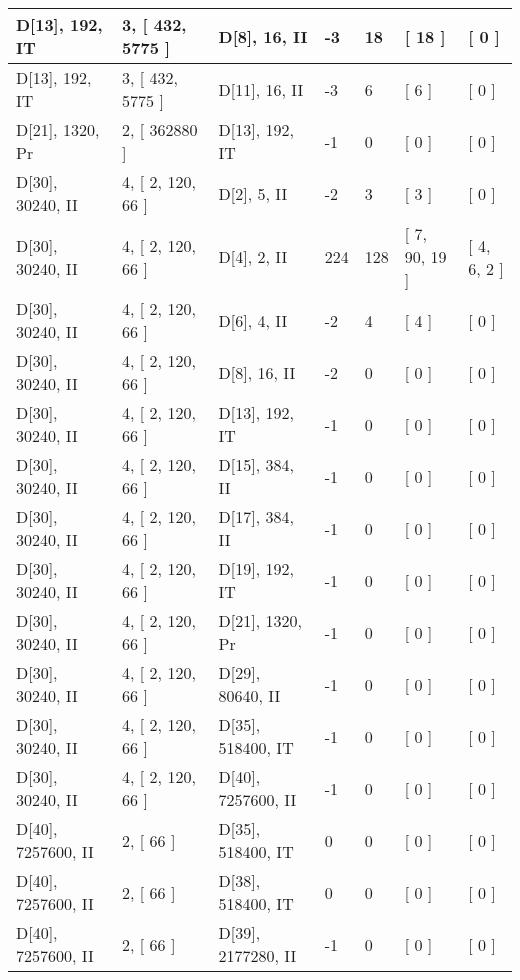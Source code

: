 \documentclass[9 pt]{scrartcl}
\begin{document}
\begin{longtable}{ |p{3em}|p{6em}|p{3em}|p{2em}|p{2em}|p{6em}|p{6em}| }
D[13], 192, IT &3, [ 432, 5775 ] & D[8], 16, II  & -3 & 18 & [ 18 ] & [ 0 ]\\ \hline
D[13], 192, IT &3, [ 432, 5775 ] & D[11], 16, II  & -3 & 6 & [ 6 ] & [ 0 ]\\ \hline
D[21], 1320, Pr &2, [ 362880 ] & D[13], 192, IT  & -1 & 0 & [ 0 ] & [ 0 ]\\ \hline
D[30], 30240, II &4, [ 2, 120, 66 ] & D[2], 5, II  & -2 & 3 & [ 3 ] & [ 0 ]\\ \hline
D[30], 30240, II &4, [ 2, 120, 66 ] & D[4], 2, II  & 224 & 128 & [ 7, 90, 19 ] & [ 4, 6, 2 ]\\ \hline
D[30], 30240, II &4, [ 2, 120, 66 ] & D[6], 4, II  & -2 & 4 & [ 4 ] & [ 0 ]\\ \hline
D[30], 30240, II &4, [ 2, 120, 66 ] & D[8], 16, II  & -2 & 0 & [ 0 ] & [ 0 ]\\ \hline
D[30], 30240, II &4, [ 2, 120, 66 ] & D[13], 192, IT  & -1 & 0 & [ 0 ] & [ 0 ]\\ \hline
D[30], 30240, II &4, [ 2, 120, 66 ] & D[15], 384, II  & -1 & 0 & [ 0 ] & [ 0 ]\\ \hline
D[30], 30240, II &4, [ 2, 120, 66 ] & D[17], 384, II  & -1 & 0 & [ 0 ] & [ 0 ]\\ \hline
D[30], 30240, II &4, [ 2, 120, 66 ] & D[19], 192, IT  & -1 & 0 & [ 0 ] & [ 0 ]\\ \hline
D[30], 30240, II &4, [ 2, 120, 66 ] & D[21], 1320, Pr  & -1 & 0 & [ 0 ] & [ 0 ]\\ \hline
D[30], 30240, II &4, [ 2, 120, 66 ] & D[29], 80640, II  & -1 & 0 & [ 0 ] & [ 0 ]\\ \hline
D[30], 30240, II &4, [ 2, 120, 66 ] & D[35], 518400, IT  & -1 & 0 & [ 0 ] & [ 0 ]\\ \hline
D[30], 30240, II &4, [ 2, 120, 66 ] & D[40], 7257600, II  & -1 & 0 & [ 0 ] & [ 0 ]\\ \hline
D[40], 7257600, II &2, [ 66 ] & D[35], 518400, IT  & 0 & 0 & [ 0 ] & [ 0 ]\\ \hline
D[40], 7257600, II &2, [ 66 ] & D[38], 518400, IT  & 0 & 0 & [ 0 ] & [ 0 ]\\ \hline
D[40], 7257600, II &2, [ 66 ] & D[39], 2177280, II  & -1 & 0 & [ 0 ] & [ 0 ]\\ \hline

\end{longtable}
\end{document}

